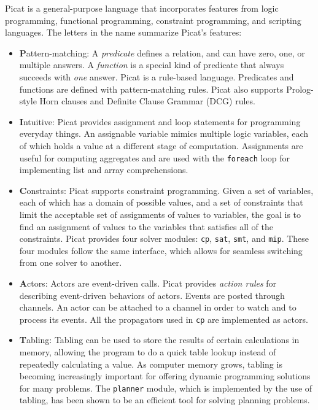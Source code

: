 Picat is a general-purpose language that incorporates features from logic programming, functional programming, constraint programming,  and scripting languages. The letters in the name summarize Picat's features:

\begin{itemize}
\item \textbf{P}attern-matching: A \emph{predicate} defines a relation, and can have zero, one, or multiple answers. A \emph{function} is a special kind of predicate that always succeeds with \emph{one} answer. Picat is a rule-based language. Predicates and functions are defined with pattern-matching rules. Picat also supports Prolog-style Horn clauses and Definite Clause Grammar (DCG) rules.

\item \textbf{I}ntuitive: Picat provides assignment and loop statements for programming everyday things. An assignable variable mimics multiple logic variables, each of which holds a value at a different stage of computation. Assignments are useful for computing aggregates and are used with the {\tt foreach} loop for implementing list and array comprehensions.

\item \textbf{C}onstraints: Picat supports constraint programming.  Given a set of variables, each of which has a domain of possible values, and a set of constraints that limit the acceptable set of assignments of values to variables, the goal is to find an assignment of values to the variables that satisfies all of the constraints. Picat provides four solver modules: {\tt cp}, {\tt sat}, {\tt smt}, and {\tt mip}. These four modules follow the same interface, which allows for seamless switching from one solver to another.

\item \textbf{A}ctors: Actors are event-driven calls.  Picat provides \emph{action rules} for describing event-driven behaviors of actors. Events are posted through channels. An actor can be attached to a channel in order to watch and to process its events. All the propagators used in {\tt cp} are implemented as actors.

\item \textbf{T}abling: Tabling can be used to store the results of certain calculations in memory, allowing the program to do a quick table lookup instead of repeatedly calculating a value. As computer memory grows, tabling is becoming increasingly important for offering dynamic programming solutions for many problems. The \texttt{planner} module, which is implemented by the use of tabling, has been shown to be an efficient tool for solving planning problems.

\end{itemize}

